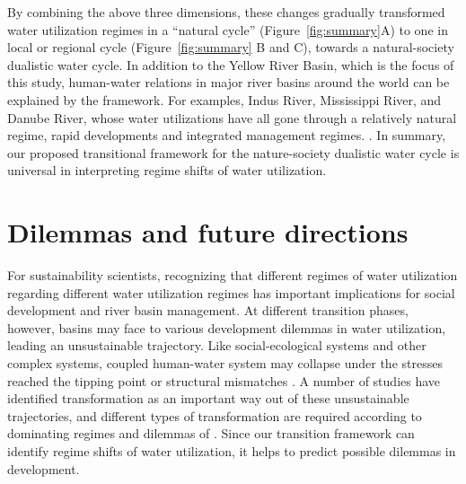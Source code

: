 \documentclass[9pt, twocolumn, twoside, lineno]{pnas-new}
\begin{document}
By combining the above three dimensions, these changes gradually transformed water utilization regimes in a ``natural cycle'' (Figure~\ref{fig:summary}A) to one in local or regional cycle (Figure~\ref{fig:summary} B and C), towards a natural-society dualistic water cycle. In addition to the Yellow River Basin, which is the focus of this study, human-water relations in major river basins around the world can be explained by the framework. For examples, Indus River, Mississippi River, and Danube River, whose water utilizations have all gone through a relatively natural regime, rapid developments and integrated management regimes. \cite{bestAnthropogenicStressesWorld2019,cummingResilienceBigRiver2011}. In summary, our proposed transitional framework for the nature-society dualistic water cycle is universal in interpreting regime shifts of water utilization.

\section*{Dilemmas and future directions}
For sustainability scientists, recognizing that different regimes of water utilization regarding different water utilization regimes has important implications for social development and river basin management.
At different transition phases, however, basins may face to various development dilemmas in water utilization, leading an unsustainable trajectory. 
Like social-ecological systems and other complex systems, coupled human-water system may collapse under the stresses reached the tipping point or structural mismatches 
\cite{reyersSocialEcologicalSystemsInsights2018,cummingQuantifyingSocialEcologicalScale2020,wangCOSUSTMs0530Review}. 
A number of studies have identified transformation as an important way out of these unsustainable trajectories, and different types of transformation are required according to dominating regimes and dilemmas of \cite{scoonesTransformationsSustainabilityCombining2020a,steffenTrajectoriesEarthSystem2018}. 
Since our transition framework can identify regime shifts of water utilization, it helps to predict possible dilemmas in development.
\end{document}
